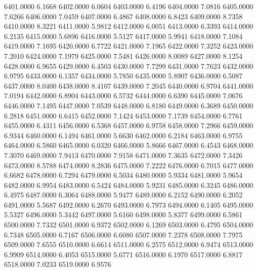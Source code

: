 6401.0000      6.1668
6402.0000      6.0604
6403.0000      6.4196
6404.0000      7.0816
6405.0000      7.6266
6406.0000      7.0459
6407.0000      6.4867
6408.0000      6.8423
6409.0000      8.7358
6410.0000      8.3221
6411.0000      5.9812
6412.0000      6.0051
6413.0000      6.3393
6414.0000      6.2135
6415.0000      5.6896
6416.0000      5.5127
6417.0000      5.9941
6418.0000      7.1084
6419.0000      7.1695
6420.0000      6.7722
6421.0000      7.1965
6422.0000      7.3252
6423.0000      7.2010
6424.0000      7.1979
6425.0000      7.5481
6426.0000      8.0089
6427.0000      8.1254
6428.0000      6.9655
6429.0000      6.4503
6430.0000      7.7299
6431.0000      7.7623
6432.0000      6.9795
6433.0000      6.1357
6434.0000      5.7850
6435.0000      5.8907
6436.0000      6.5087
6437.0000      8.0400
6438.0000      8.4107
6439.0000      7.2045
6440.0000      6.9704
6441.0000      7.0194
6442.0000      6.8904
6443.0000      6.5732
6444.0000      6.6390
6445.0000      7.0676
6446.0000      7.1495
6447.0000      7.0539
6448.0000      6.8180
6449.0000      6.3689
6450.0000      6.2818
6451.0000      6.6415
6452.0000      7.1424
6453.0000      7.1739
6454.0000      6.7761
6455.0000      6.4311
6456.0000      6.5368
6457.0000      6.9758
6458.0000      7.2966
6459.0000      6.9344
6460.0000      6.1494
6461.0000      5.6630
6462.0000      6.2184
6463.0000      6.9755
6464.0000      6.5860
6465.0000      6.0320
6466.0000      5.8666
6467.0000      6.4543
6468.0000      7.3070
6469.0000      7.9413
6470.0000      7.9158
6471.0000      7.3635
6472.0000      7.3426
6473.0000      8.5788
6474.0000      8.2836
6475.0000      7.2222
6476.0000      6.7015
6477.0000      6.6682
6478.0000      6.7294
6479.0000      6.5034
6480.0000      5.9334
6481.0000      5.9654
6482.0000      6.9954
6483.0000      6.5424
6484.0000      5.9231
6485.0000      6.3245
6486.0000      6.4975
6487.0000      6.3064
6488.0000      5.9477
6489.0000      6.2152
6490.0000      6.2052
6491.0000      5.5687
6492.0000      6.2670
6493.0000      6.7973
6494.0000      6.1405
6495.0000      5.5327
6496.0000      5.3442
6497.0000      5.6160
6498.0000      5.8377
6499.0000      6.5861
6500.0000      7.7332
6501.0000      6.9372
6502.0000      6.1269
6503.0000      6.4795
6504.0000      6.7348
6505.0000      6.7167
6506.0000      6.6080
6507.0000      7.2378
6508.0000      7.7975
6509.0000      7.6555
6510.0000      6.6614
6511.0000      6.2575
6512.0000      6.9474
6513.0000      6.9909
6514.0000      6.4053
6515.0000      5.6771
6516.0000      6.1970
6517.0000      6.8817
6518.0000      7.0233
6519.0000      6.9576
